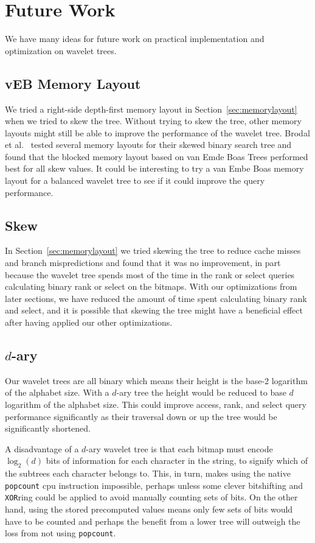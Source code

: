 \section{Future Work}
We have many ideas for future work on practical implementation and optimization on wavelet trees.

\subsection{vEB Memory Layout}
\label{sec:futurework_vebmemorylayout}
We tried a right-side depth-first memory layout in Section~\ref{sec:memorylayout} when we tried to skew the tree.
Without trying to skew the tree, other memory layouts might still be able to improve the performance of the wavelet tree.
Brodal et al.~ tested several memory layouts for their skewed binary search tree and found that the blocked memory layout based on van Emde Boas Trees performed best for all skew values.
It could be interesting to try a van Embe Boas memory layout for a balanced wavelet tree to see if it could improve the query performance.

\subsection{Skew}
In Section~\ref{sec:memorylayout} we tried skewing the tree to reduce cache misses and branch mispredictions and found that it was no improvement, in part because the wavelet tree spends most of the time in the rank or select queries calculating binary rank or select on the bitmaps.
With our optimizations from later sections, we have reduced the amount of time spent calculating binary rank and select, and it is possible that skewing the tree might have a beneficial effect after having applied our other optimizations.

\subsection{$d$-ary}
Our wavelet trees are all binary which means their height is the base-2 logarithm of the alphabet size.
With a $d$-ary tree the height would be reduced to base $d$ logarithm of the alphabet size.
This could improve access, rank, and select query performance significantly as their traversal down or up the tree would be significantly shortened.

A disadvantage of a $d$-ary wavelet tree is that each bitmap must encode $\log_2(d)$ bits of information for each character in the string, to signify which of the subtrees each character belongs to.
This, in turn, makes using the native \texttt{popcount} cpu instruction impossible, perhaps unless some clever bitshifting and \texttt{XOR}ring could be applied to avoid manually counting sets of bits.
On the other hand, using the stored precomputed values means only few sets of bits would have to be counted and perhaps the benefit from a lower tree will outweigh the loss from not using \texttt{popcount}.

